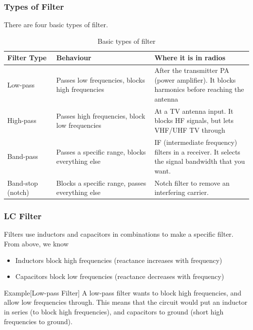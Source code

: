 \documentclass{article}
\begin{document}
\subsubsection{Types of Filter}
There are four basic types of filter.
\begin{table}[h]
    \centering
    \caption{Basic types of filter}
    \label{tab:2}
    \begin{tabular}{p{0.2\linewidth}|p{0.4\linewidth}|p{0.4\linewidth}}
        Filter Type & Behaviour & Where it is in radios \\
        \hline
        \hline
        Low-pass & Passes low frequencies, blocks high frequencies & After the transmitter PA (power amplifier). It blocks harmonics before reaching the antenna \\
        \hline
            High-pass & Passes high frequencies, block low frequencies & At a TV antenna input. It blocks HF signals, but lets VHF/UHF TV through \\
        \hline
            Band-pass & Passes a specific range, blocks everything else & IF (intermediate frequency) filters in a receiver. It selects the signal bandwidth that you want. \\
        \hline
            Band-stop (notch) & Blocks a specific range, passes everything else & Notch filter to remove an interfering carrier.
    \end{tabular}
\end{table}

\subsubsection{LC Filter}
Filters use inductors and capacitors in combinations to make a specific filter. From above, we know
\begin{itemize}
    \item Inductors block high frequencies (reactance increases with frequency)
    \item Capacitors block low frequencies (reactance decreases with frequency)
\end{itemize}

\begin{callout}{Example}[Low-pass Filter]
    A low-pass filter wants to block high frequencies, and allow low frequencies through. This means that the circuit would put an inductor in series (to block high frequencies), and capacitors to ground (short high frequencies to ground).
\end{callout}
\end{document}
